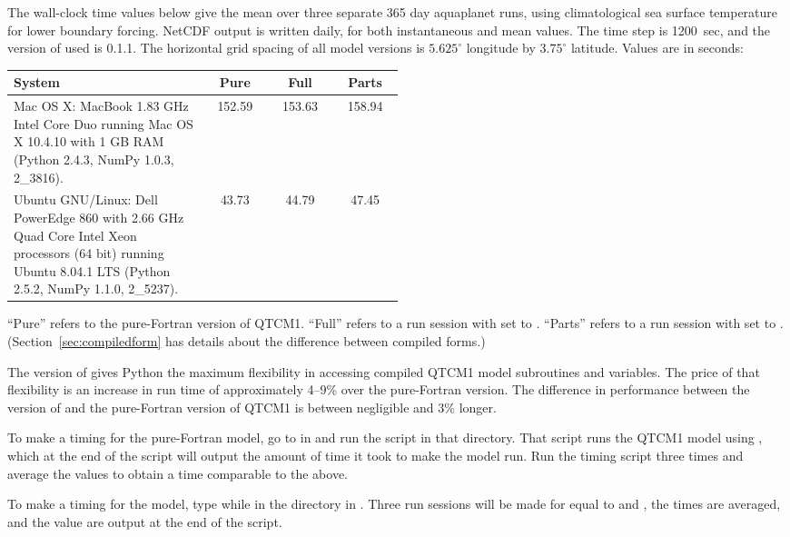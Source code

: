 

%

The wall-clock time values below give the mean over three
separate 365 day aquaplanet runs,
using climatological sea surface temperature for lower boundary forcing.
NetCDF output is written daily, for both instantaneous and mean values.
The time step is 1200~sec, and the version of  used
is 0.1.1.
The horizontal grid spacing of all model versions is
$5.625^{\circ}$ longitude by $3.75^{\circ}$ latitude.
Values are in seconds:
\begin{center}
\begin{tabular}{p{0.5\linewidth}|c|c|c}
\textbf{System} & \textbf{Pure} & \textbf{Full} & \textbf{Parts} \\
\hline
Mac OS X:  MacBook 1.83 GHz Intel Core Duo running Mac OS X
	10.4.10 with 1 GB RAM
	(Python 2.4.3, NumPy 1.0.3, \mods{f2py} 2\_3816).
    & 152.59 & 153.63 & 158.94 \\
\hline
Ubuntu GNU/Linux:  Dell PowerEdge 860 with 2.66 GHz Quad Core Intel
	Xeon processors (64 bit) running Ubuntu 8.04.1 LTS
	(Python 2.5.2, NumPy 1.1.0, \mods{f2py} 2\_5237).
    & 43.73 & 44.79 & 47.45
\end{tabular}
\end{center}

``Pure'' refers to the pure-Fortran version of QTCM1.
``Full'' refers to a  run session with 
set to .  ``Parts'' refers to a  run session
with  set to .
(Section~\ref{sec:compiledform} has details about the difference
between compiled forms.)

The  version of  gives Python the maximum
flexibility in accessing compiled QTCM1 model subroutines and
variables.  The price of that flexibility is an increase in
run time of approximately 4--9\% over the pure-Fortran version.
The difference in performance between the
 version of  and the pure-Fortran version of
QTCM1 is between negligible and 3\% longer.

To make a timing for the pure-Fortran model, go to
 in  and run the
 script in that directory.  That script runs the
QTCM1 model using , which at the end of the
script will output the amount of time it took to make the model
run.  Run the timing script three times and average the values to
obtain a time comparable to the above.

To make a timing for the  model, type  while in the  directory in .
Three run sessions will be made for  equal to
 and , the times are averaged, and the
value are output at the end of the script.




